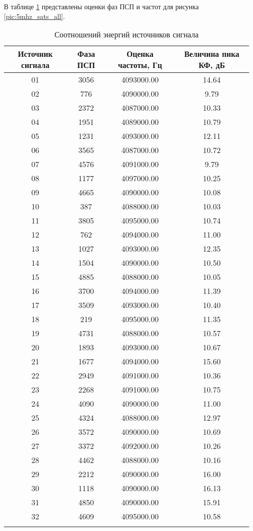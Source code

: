 В таблице \ref{tbl:5mhz_sats_all} представлены оценки фаз ПСП и частот для рисунка \ref{pic:5mhz_sats_all}.
\begin{center}
	\begin{longtable}{ | c | c | c | c |}
	\hline
	Источник сигнала & Фаза ПСП & Оценка частоты, Гц & Величина пика КФ, дБ \\ \hline
	01 & 3056 & 4093000.00 & 14.64 \\ \hline 
	02 & 776  & 4090000.00 & 9.79  \\ \hline
	03 & 2372 & 4087000.00 & 10.33 \\ \hline
	04 & 1951 & 4089000.00 & 10.79 \\ \hline
	05 & 1231 & 4093000.00 & 12.11 \\ \hline
	06 & 3565 & 4087000.00 & 10.72 \\ \hline
	07 & 4576 & 4091000.00 & 9.79  \\ \hline
	08 & 1177 & 4097000.00 & 10.25 \\ \hline
	09 & 4665 & 4090000.00 & 10.08 \\ \hline
	10 & 387  & 4088000.00 & 10.03 \\ \hline
	11 & 3805 & 4095000.00 & 10.74 \\ \hline
	12 & 762  & 4094000.00 & 11.00 \\ \hline
	13 & 1027 & 4093000.00 & 12.35 \\ \hline
	14 & 1504 & 4090000.00 & 10.50 \\ \hline
	15 & 4885 & 4088000.00 & 10.05 \\ \hline
	16 & 3700 & 4094000.00 & 11.39 \\ \hline
	17 & 3509 & 4093000.00 & 10.40 \\ \hline
	18 & 219  & 4095000.00 & 11.35 \\ \hline
	19 & 4731 & 4088000.00 & 10.57 \\ \hline
	20 & 1893 & 4093000.00 & 10.67 \\ \hline
	21 & 1677 & 4094000.00 & 15.60 \\ \hline
	22 & 2949 & 4091000.00 & 10.36 \\ \hline
	23 & 2268 & 4091000.00 & 10.75 \\ \hline
	24 & 4090 & 4090000.00 & 11.00 \\ \hline
	25 & 4324 & 4088000.00 & 12.97 \\ \hline
	26 & 3572 & 4090000.00 & 10.69 \\ \hline
	27 & 3372 & 4092000.00 & 10.26 \\ \hline
	28 & 4462 & 4088000.00 & 10.16 \\ \hline
	29 & 2212 & 4090000.00 & 16.00 \\ \hline
	30 & 1118 & 4090000.00 & 16.13 \\ \hline
	31 & 4850 & 4090000.00 & 15.91 \\ \hline
	32 & 4609 & 4095000.00 & 10.58 \\ \hline
	\caption{Соотношений энергий источников сигнала}
	\label{tbl:5mhz_sats_all}
	\end{longtable}
\end{center}

